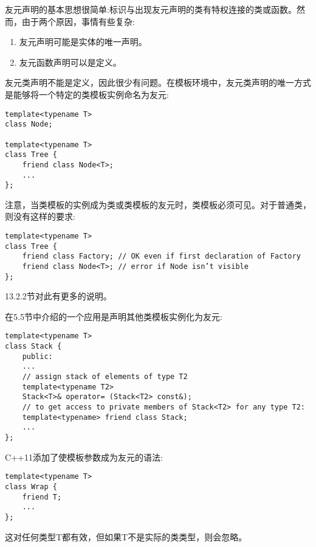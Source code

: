 
友元声明的基本思想很简单:标识与出现友元声明的类有特权连接的类或函数。然而，由于两个原因，事情有些复杂:

\begin{enumerate}
\item 
友元声明可能是实体的唯一声明。

\item 
友元函数声明可以是定义。
\end{enumerate}


友元类声明不能是定义，因此很少有问题。在模板环境中，友元类声明的唯一方式是能够将一个特定的类模板实例命名为友元:

\begin{lstlisting}[style=styleCXX]
template<typename T>
class Node;

template<typename T>
class Tree {
	friend class Node<T>;
	...
};
\end{lstlisting}

注意，当类模板的实例成为类或类模板的友元时，类模板必须可见。对于普通类，则没有这样的要求:

\begin{lstlisting}[style=styleCXX]
template<typename T>
class Tree {
	friend class Factory; // OK even if first declaration of Factory
	friend class Node<T>; // error if Node isn’t visible
};
\end{lstlisting}

13.2.2节对此有更多的说明。

在5.5节中介绍的一个应用是声明其他类模板实例化为友元:

\begin{lstlisting}[style=styleCXX]
template<typename T>
class Stack {
	public:
	...
	// assign stack of elements of type T2
	template<typename T2>
	Stack<T>& operator= (Stack<T2> const&);
	// to get access to private members of Stack<T2> for any type T2:
	template<typename> friend class Stack;
	...
};
\end{lstlisting}

C++11添加了使模板参数成为友元的语法:

\begin{lstlisting}[style=styleCXX]
template<typename T>
class Wrap {
	friend T;
	...
};
\end{lstlisting}

这对任何类型T都有效，但如果T不是实际的类类型，则会忽略。


